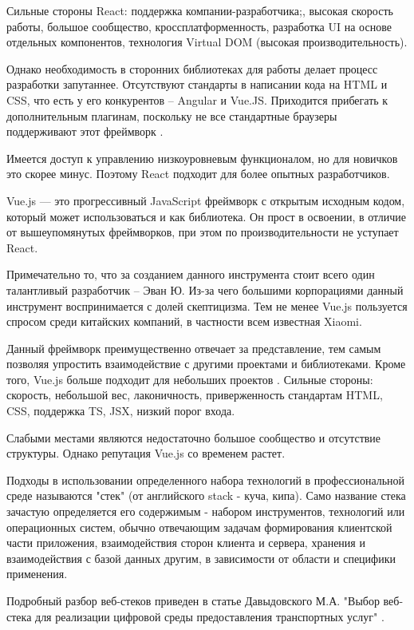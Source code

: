 Сильные стороны React: поддержка компании-разработчика;, высокая скорость работы, большое сообщество, кроссплатформенность, разработка UI на основе отдельных компонентов, технология Virtual DOM (высокая производительность).

Однако необходимость в сторонних библиотеках для работы делает процесс разработки запутаннее.
Отсутствуют стандарты в написании кода на HTML и CSS, что есть у его конкурентов – Angular и Vue.JS.
Приходится прибегать к дополнительным плагинам, поскольку не все стандартные браузеры поддерживают этот фреймворк \cite{sergacheva-framework-3}.

Имеется доступ к управлению низкоуровневым функционалом, но для новичков это скорее минус.
Поэтому React подходит для более опытных разработчиков.

Vue.js — это прогрессивный JavaScript фреймворк с открытым исходным кодом, который может использоваться и как библиотека.
Он прост в освоении, в отличие от вышеупомянутых фреймворков, при этом по производительности не уступает React.

Примечательно то, что за созданием данного инструмента стоит всего один талантливый разработчик – Эван Ю.
Из-за чего большими корпорациями данный инструмент воспринимается с долей скептицизма.
Тем не менее Vue.js пользуется спросом среди китайских компаний, в частности всем известная Xiaomi.

Данный фреймворк преимущественно отвечает за представление, тем самым позволяя упростить
взаимодействие с другими проектами и библиотеками.
Кроме того, Vue.js больше подходит для небольших проектов \cite{sergacheva-framework-4}.
Сильные стороны: скорость, небольшой вес, лаконичность, приверженность стандартам HTML, CSS, поддержка TS, JSX, низкий порог входа.

Слабыми местами являются недостаточно большое сообщество и отсутствие структуры.
Однако репутация Vue.js со временем растет.


Подходы в использовании определенного набора технологий в профессиональной среде называются "стек" (от английского stack - куча, кипа).
Само название стека зачастую определяется его содержимым - набором инструментов, технологий или операционных систем, обычно отвечающим  задачам формирования клиентской части приложения, взаимодействия сторон клиента и сервера, хранения и взаимодействия с базой данных другим, в зависимости от области и специфики применения.


Подробный разбор веб-стеков приведен в статье Давыдовского М.А. "Выбор веб-стека для реализации цифровой среды предоставления транспортных услуг" \cite{davidovsky-vibor}.

